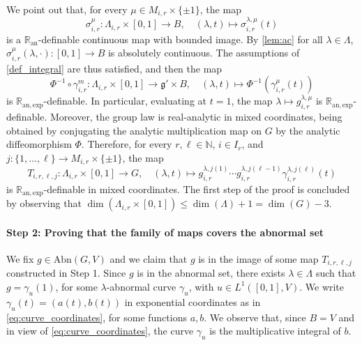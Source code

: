\documentclass[a4paper,11pt,reqno]{amsart}
\theoremstyle{plain}
\theoremstyle{definition}
\newcommand{\Ran}{\mathbb R_{\mathrm{an}}}
\newcommand{\Ranexp}{\mathbb R_{\mathrm{an,exp}}}
\newcommand{\N}{\mathbb N}
\newcommand{\g}{\mathfrak{g}}
\newcommand{\abn}{\mathrm{Abn}}
\begin{document}
    We point out that, for every $\mu \in M_{i,r} \times \{\pm 1\}$, the map
    \begin{equation*}
        \sigma^\mu_{i,r} \colon \Lambda_{i,r} \times [0,1] \to B, \quad (\lambda,t) \mapsto \sigma^{\lambda,\mu}_{i,r}(t)
    \end{equation*}
    is a $\Ran$-definable  continuous map with bounded image. By \cref{lem:ac} for all $\lambda \in \Lambda$, $\sigma^{\mu}_{i,r}(\lambda,\cdot):[0,1]\to B$ is absolutely continuous. The assumptions of \cref{def_integral} are thus satisfied, and then the map
\begin{equation*}
    \Phi^{-1}\circ \gamma^m_{i,r} \colon \Lambda_{i,r} \times [0,1] \to \g' \times B, \quad (\lambda,t) \mapsto \Phi^{-1}( \gamma^\mu_{i,r}(t))
\end{equation*}
is $\Ranexp$-definable. In particular, evaluating at $t=1$, the map $\lambda \mapsto g^{\lambda,\mu}_{i,r}$ is $\Ranexp$-definable. Moreover, the group law is real-analytic in mixed coordinates, being obtained by conjugating the analytic multiplication map on $G$ by the analytic diffeomorphism $\Phi$. 
Therefore, for every $r,\ell \in \N$, $i \in I_r$, and $j \colon \{1,\dots,\ell\} \to M_{i,r} \times \{\pm 1\}$, the map
\begin{equation*}
    T_{i,r,\ell,j} \colon \Lambda_{i,r} \times [0,1] \to G,
    \quad
    (\lambda,t) \mapsto g^{\lambda,j(1)}_{i,r}\cdots g^{\lambda,j(\ell-1)}_{i,r}\gamma^{\lambda,j(\ell)}_{i,r}(t)
\end{equation*}
is $\Ranexp$-definable in mixed coordinates.
The first step of the proof is concluded by observing that $\dim(\Lambda_{i,r} \times [0,1]) \le \dim(\Lambda) + 1 = \dim(G)-3$.    
\medskip
\paragraph{\textbf{Step 2: Proving that the family of maps covers the abnormal set}}
    
    We fix $g \in \abn(G,V)$ and we claim that $g$ is in the image of some map $T_{i,r,\ell,j}$ constructed in Step 1. Since $g$ is in the abnormal set, there exists $\lambda \in \Lambda$ such that $g = \gamma_u(1)$, for some $\lambda$-abnormal curve $\gamma_u$, with $u \in L^1([0,1],V)$.
    We write $\gamma_u(t) =(a(t),b(t))$ in exponential coordinates as in \eqref{eq:curve_coordinates}, for some functions $a,b$.
    We observe that, since $B=V$ and in view of \eqref{eq:curve_coordinates}, the curve $\gamma_u$ is the multiplicative integral of $b$. 
\end{document}
